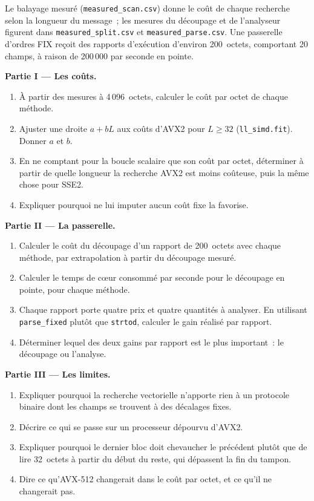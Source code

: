 \begin{problem}\label{pb:ll:vector-instructions-and-data-parallel-code:1}
Le balayage mesuré (\texttt{measured\_scan.csv}) donne le coût de chaque recherche selon la longueur du message~; les mesures du découpage et de l'analyseur
figurent dans \texttt{measured\_split.csv} et \texttt{measured\_parse.csv}. Une passerelle d'ordres FIX reçoit des rapports d'exécution
d'environ 200~octets, comportant 20 champs, à raison de 200\,000 par seconde en pointe.

\medskip\noindent\textbf{Partie I --- Les coûts.}
\begin{enumerate}
\item À partir des mesures à 4\,096~octets, calculer le coût par octet de chaque méthode.
\item Ajuster une droite $a + bL$ aux coûts d'AVX2 pour $L \ge 32$ (\texttt{ll\_simd.fit}). Donner $a$ et $b$.
\item En ne comptant pour la boucle scalaire que son coût par octet, déterminer à partir de quelle longueur la recherche AVX2 est moins coûteuse, puis la même chose pour SSE2.
\item Expliquer pourquoi ne lui imputer aucun coût fixe la favorise.
\end{enumerate}

\medskip\noindent\textbf{Partie II --- La passerelle.}
\begin{enumerate}[resume]
\item Calculer le coût du découpage d'un rapport de 200~octets avec chaque méthode, par extrapolation à partir du découpage mesuré.
\item Calculer le temps de cœur consommé par seconde pour le découpage en pointe, pour chaque méthode.
\item Chaque rapport porte quatre prix et quatre quantités à analyser. En utilisant \texttt{parse\_fixed} plutôt que \texttt{strtod}, calculer
le gain réalisé par rapport.
\item Déterminer lequel des deux gains par rapport est le plus important~: le découpage ou l'analyse.
\end{enumerate}

\medskip\noindent\textbf{Partie III --- Les limites.}
\begin{enumerate}[resume]
\item Expliquer pourquoi la recherche vectorielle n'apporte rien à un protocole binaire dont les champs se trouvent à des décalages fixes.
\item Décrire ce qui se passe sur un processeur dépourvu d'AVX2.
\item Expliquer pourquoi le dernier bloc doit chevaucher le précédent plutôt que de lire 32~octets à partir du début du reste, qui dépassent la fin du tampon.
\item Dire ce qu'AVX-512 changerait dans le coût par octet, et ce qu'il ne changerait pas.
\end{enumerate}


\end{problem}
